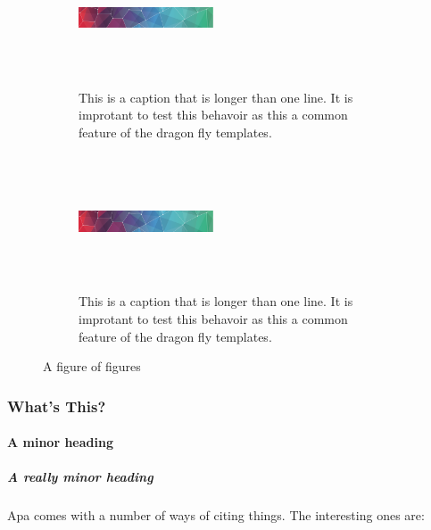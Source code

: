 \documentclass[draft]{dragonfly-report}
\begin{document}
\begin{figure}[h]

  \begin{subfigure}{0.45\textwidth}
  \includegraphics[width=40mm,height=40mm]{pattern}
  \caption{This is a caption that is longer than one line. It is improtant to test 
  this behavoir as this a common feature of the dragon fly templates.}
\end{subfigure}\qquad %
  \begin{subfigure}{0.45\textwidth}
  \includegraphics[width=40mm,height=40mm]{pattern}
  \caption{This is a caption that is longer than one line. It is improtant to test 
  this behavoir as this a common feature of the dragon fly templates.}
\end{subfigure}
\caption{A figure of figures}
\end{figure}

\subsubsection{What's This?}
\lipsum[3] 
\paragraph{A minor heading}
\lipsum[5] 
\subparagraph{A really minor heading}
\lipsum[4]

Apa comes with a number of ways of citing things.
The interesting ones are:
\end{document}
